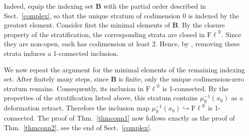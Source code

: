 \documentclass[12pt]{amsart}
\theoremstyle{definition}
\theoremstyle{remark}
\newcommand{\RR}{\mathbb R}
\newcommand{\Fl}{{\mathrm{F\ell}}}
\begin{document}
Indeed, equip the indexing set {\bf B} with the partial order described in Sect.~\ref{complex}, so that the unique stratum of codimension 0 is indexed by the greatest element. Consider first the minimal elements of {\bf B}. By the closure property of the stratification, the corresponding strata are closed in $\Fl^\RR$. Since they are non-open, each has codimension at least 2. Hence, by \cite[Theorem 1.11]{BW}, removing these strata induces a 1-connected inclusion.

We now repeat the argument for the minimal elements of the remaining indexing set. After finitely many steps, since {\bf B} is finite, only the unique codimension-zero stratum remains. Consequently, its inclusion in $\Fl^\RR$ is 1-connected. By the properties of the stratification listed above, this stratum contains
$
\mu_\RR^{-1}(x_0)
$
as a deformation retract. Therefore the inclusion map
$
\mu_\RR^{-1}(x_0)\hookrightarrow \Fl^\RR
$
is 1-connected.
The proof of Thm.~\ref{thmconn1} now follows exactly as the proof of Thm.~\ref{thmconn2}, see the end of Sect.~\ref{complex}. 
\end{document}
